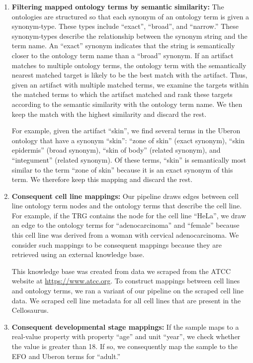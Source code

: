 \begin{enumerate}
\item \textbf{Filtering mapped ontology terms by semantic similarity:}
The ontologies are structured so that each synonym of an ontology term is given a synonym-type. These types include ``exact'', ``broad'', and ``narrow.'' These synonym-types describe the relationship between the synonym string and the term name.  An ``exact'' synonym indicates that the string is semantically closer to the ontology term name than a ``broad'' synonym.  If an artifact matches to multiple ontology terms, the ontology term with the semantically nearest matched target is likely to be the best match with the artifact. Thus, given an artifact with multiple matched terms, we examine the targets within the matched terms to which the artifact matched and rank these targets according to the semantic similarity with the ontology term name.  We then keep the match with the highest similarity and discard the rest.  

For example, given the artifact ``skin'', we find several terms in the Uberon ontology that have a synonym ``skin'':  ``zone of skin'' (exact synonym), ``skin epidermis'' (broad synonym), ``skin of body'' (related synonym), and ``integument'' (related synonym). Of these terms, ``skin'' is semantically most similar to the term ``zone of skin'' because it is an exact synonym of this term.  We therefore keep this mapping and discard the rest.

\item \textbf{Consequent cell line mappings:} Our pipeline draws edges between cell line ontology term nodes and the ontology terms that describe the cell line.   For example, if the TRG contains the node for the cell line ``HeLa'', we draw an edge to the ontology terms for ``adenocarcinoma'' and ``female'' because this cell line was derived from a woman with cervical adenocarcinoma.  We consider such mappings to be consequent mappings because they are retrieved using an external knowledge base.   
 
 This knowledge base was created from data we scraped from the ATCC website at \url{https://www.atcc.org}. To construct mappings between cell lines and ontology terms, we ran a variant of our pipeline on the scraped cell line data.  We scraped cell line metadata for all cell lines that are present in the Cellosaurus. 

\item \textbf{Consequent developmental stage mappings:} If the sample maps to a real-value property with property ``age'' and unit ``year'', we check whether the value is greater than 18. If so, we consequently map the sample to the EFO and Uberon terms for ``adult.''
\end{enumerate}


